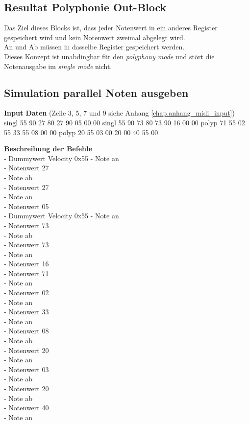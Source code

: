 \subsection{Resultat Polyphonie Out-Block}
Das Ziel dieses Blocks ist, dass jeder Notenwert in ein anderes Register gespeichert wird und kein Notenwert zweimal abgelegt wird.\\
An und Ab müssen in dasselbe Register gespeichert werden.\\
Dieses Konzept ist unabdingbar für den \textit{polyphony mode} und stört die Notenausgabe im \textit{single mode} nicht. 
\subsection{Simulation parallel Noten ausgeben}
\textbf{Input Daten} (Zeile 3, 5, 7 und 9 siehe Anhang \ref{chap.anhang_midi_input})\\
singl 55 90 27 80 27 90 05 00 00
singl 55 90 73 80 73 90 16 00 00
polyp 71 55 02 55 33 55 08 00 00
polyp 20 55 03 00 20 00 40 55 00

\textbf{Beschreibung der Befehle}\\
- Dummywert Velocity 0x55
- Note an \\
- Notenwert 27\\
- Note ab \\
- Notenwert 27\\
- Note an\\
- Notenwert 05\\

- Dummywert Velocity 0x55
- Note an\\
- Notenwert 73\\
- Note ab\\
- Notenwert 73\\
- Note an\\
- Notenwert 16\\

- Notenwert 71\\
- Note an\\
- Notenwert 02\\
- Note an\\
- Notenwert 33\\
- Note an\\
- Notenwert 08\\
- Note ab\\

- Notenwert 20\\
- Note an\\
- Notenwert 03\\
- Note ab\\
- Notenwert 20\\
- Note ab\\
- Notenwert 40\\
- Note an\\

